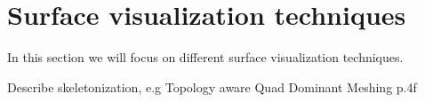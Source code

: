 

\section{Surface visualization techniques}

In this section we will focus on different surface visualization techniques.





Describe skeletonization, e.g Topology aware Quad Dominant Meshing p.4f